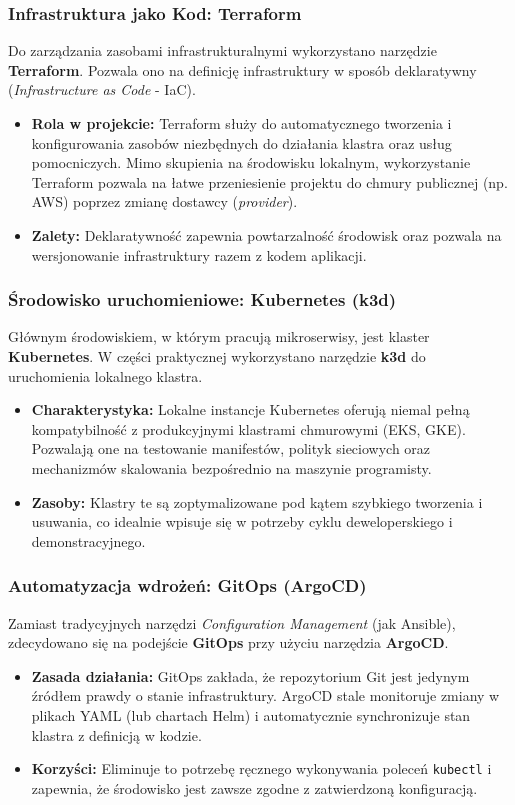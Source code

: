 \subsubsection{Infrastruktura jako Kod: Terraform}
Do zarządzania zasobami infrastrukturalnymi wykorzystano narzędzie \textbf{Terraform}. Pozwala ono na definicję infrastruktury w sposób deklaratywny (\textit{Infrastructure as Code} - IaC).
\begin{itemize}
    \item \textbf{Rola w projekcie:} Terraform służy do automatycznego tworzenia i konfigurowania zasobów niezbędnych do działania klastra oraz usług pomocniczych. Mimo skupienia na środowisku lokalnym, wykorzystanie Terraform pozwala na łatwe przeniesienie projektu do chmury publicznej (np. AWS) poprzez zmianę dostawcy (\textit{provider}).
    \item \textbf{Zalety:} Deklaratywność zapewnia powtarzalność środowisk oraz pozwala na wersjonowanie infrastruktury razem z kodem aplikacji.
\end{itemize}

\subsubsection{Środowisko uruchomieniowe: Kubernetes (k3d)}
Głównym środowiskiem, w którym pracują mikroserwisy, jest klaster \textbf{Kubernetes}. W części praktycznej wykorzystano narzędzie \textbf{k3d} do uruchomienia lokalnego klastra.
\begin{itemize}
    \item \textbf{Charakterystyka:} Lokalne instancje Kubernetes oferują niemal pełną kompatybilność z produkcyjnymi klastrami chmurowymi (EKS, GKE). Pozwalają one na testowanie manifestów, polityk sieciowych oraz mechanizmów skalowania bezpośrednio na maszynie programisty.
    \item \textbf{Zasoby:} Klastry te są zoptymalizowane pod kątem szybkiego tworzenia i usuwania, co idealnie wpisuje się w potrzeby cyklu deweloperskiego i demonstracyjnego.
\end{itemize}

\subsubsection{Automatyzacja wdrożeń: GitOps (ArgoCD)}
Zamiast tradycyjnych narzędzi \textit{Configuration Management} (jak Ansible), zdecydowano się na podejście \textbf{GitOps} przy użyciu narzędzia \textbf{ArgoCD}.
\begin{itemize}
    \item \textbf{Zasada działania:} GitOps zakłada, że repozytorium Git jest jedynym źródłem prawdy o stanie infrastruktury. ArgoCD stale monitoruje zmiany w plikach YAML (lub chartach Helm) i automatycznie synchronizuje stan klastra z definicją w kodzie.
    \item \textbf{Korzyści:} Eliminuje to potrzebę ręcznego wykonywania poleceń \texttt{kubectl} i zapewnia, że środowisko jest zawsze zgodne z zatwierdzoną konfiguracją.
\end{itemize}

